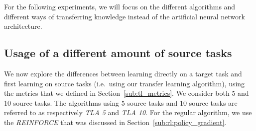 For the following experiments, we will focus on the different algorithms and different ways of transferring knowledge instead of the artificial neural network architecture.

\subsection{Usage of a different amount of source tasks} %
\label{sub:without_sparse_representation_transfer}
We now explore the differences between learning directly on a target task and first learning on source tasks (i.e.\ using our transfer learning algorithm), using the metrics that we defined in Section~\ref{sub:tl_metrics}.
We consider both 5 and 10 source tasks.
The algorithms using 5 source tasks and 10 source tasks are referred to as respectively \textit{TLA 5} and \textit{TLA 10}.
For the regular algorithm, we use the \textit{REINFORCE} that was discussed in Section~\ref{sub:rl:policy_gradient}.

